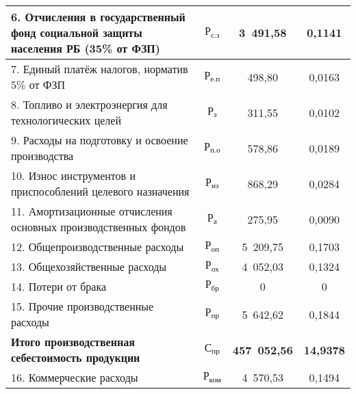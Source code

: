 {\begin{longtable}{| m{10.5cm} | c | c | c |}
      6. Отчисления в государственный фонд социальной \newline
      защиты населения РБ (35\% от ФЗП)
      & \( \text{Р}_{\text{с.з}} \) & 3~491,58 & 0,1141 \\
      \hline

      7. Единый платёж налогов, норматив 5\% от ФЗП
      & \( \text{Р}_{\text{е.п}} \) & 498,80 & 0,0163 \\
      \hline

      8. Топливо и электроэнергия для технологических целей
      & \( \text{Р}_{\text{э}} \) & 311,55 & 0,0102 \\
      \hline

      9. Расходы на подготовку и освоение производства
      & \( \text{Р}_{\text{п.о}} \) & 578,86 & 0,0189 \\
      \hline

      10. Износ инструментов и приспособлений \newline
      целевого назначения
      & \( \text{Р}_{\text{из}} \) & 868,29 & 0,0284 \\
      \hline

      11. Амортизационные отчисления основных \newline
      производственных фондов
      & \( \text{Р}_{\text{а}} \) & 275,95 & 0,0090 \\
      \hline

      12. Общепроизводственные расходы
      & \( \text{Р}_{\text{оп}} \) & 5~209,75 & 0,1703 \\
      \hline

      13. Общехозяйственные расходы
      & \( \text{Р}_{\text{ох}} \) & 4~052,03 & 0,1324 \\
      \hline

      14. Потери от брака
      & \( \text{Р}_{\text{бр}} \) & 0 & 0 \\
      \hline

      15. Прочие производственные расходы
      & \( \text{Р}_{\text{пр}} \) & 5~642,62 & 0,1844 \\
      \hline

      \textbf{Итого \newline производственная себестоимость продукции}
      & \( \mathbf{\text{С}_{\text{пр}}} \) & \textbf{457~052,56} & \textbf{14,9378} \\
      \hline

      16. Коммерческие расходы
      & \( \text{Р}_{\text{ком}} \) & 4~570,53 & 0,1494 \\
      \hline


\end{longtable}}
